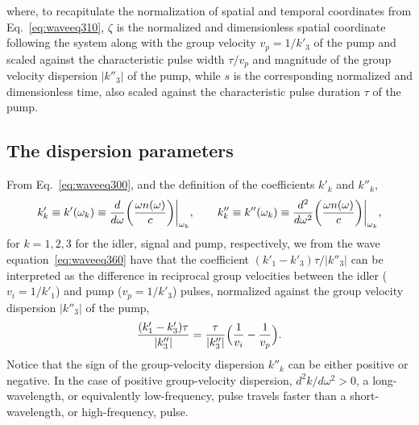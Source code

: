 \par{}\noindent
where, to recapitulate the normalization of spatial and temporal coordinates
from Eq.~\eqref{eq:waveeq310}, $\zeta$ is the normalized and dimensionless
spatial coordinate following the system along with the group velocity
$v_p=1/k'_3$ of the pump and scaled against the characteristic pulse width
$\tau/v_p$ and magnitude of the group velocity dispersion $|k''_3|$ of the
pump, while $s$ is the corresponding normalized and dimensionless time, also
scaled against the characteristic pulse duration $\tau$ of the pump.

\subsection{The dispersion parameters}
From Eq.~\eqref{eq:waveeq300}, and the definition of the coefficients $k'_k$
and $k''_k$,
$$
  k'_k \equiv k'(\omega_k)
       \equiv {{d}\over{d\omega}}
               \bigg({{\omega n(\omega)}\over{c}}\bigg)\bigg|_{\omega_k},\qquad
  k''_k \equiv k''(\omega_k)
        \equiv {{d^2}\over{d\omega^2}}
               \bigg({{\omega n(\omega)}\over{c}}\bigg)\bigg|_{\omega_k},
$$
for $k=1,2,3$ for the idler, signal and pump, respectively, we from the wave
equation~\eqref{eq:waveeq360} have that the coefficient
$(k'_1-k'_3)\tau/|k''_3|$ can be interpreted as the difference in reciprocal
group velocities between the idler ($v_i=1/k'_1$) and pump ($v_p=1/k'_3$)
pulses, normalized against the group velocity dispersion $|k''_3|$ of the pump,
$$
  {{(k'_1-k'_3)\tau}\over{|k''_3|}}=
  {{\tau}\over{|k''_3|}}\Big({{1}\over{v_i}}-{{1}\over{v_p}}\Big).
$$
Notice that the sign of the group-velocity dispersion $k''_k$ can be either
positive or negative. In the case of positive group-velocity dispersion,
$d^2k/d\omega^2>0$, a long-wavelength, or equivalently low-frequency, pulse
travels faster than a short-wavelength, or high-frequency, pulse.

